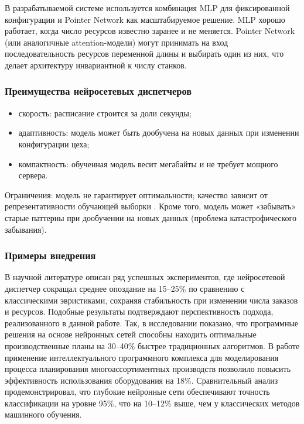 В разрабатываемой системе используется комбинация MLP для фиксированной конфигурации и Pointer Network как масштабируемое решение. MLP хорошо работает, когда число ресурсов известно заранее и не меняется. Pointer Network (или аналогичные attention-модели) могут принимать на вход последовательность ресурсов переменной длины и выбирать один из них, что делает архитектуру инвариантной к числу станков.

\subsubsection{Преимущества нейросетевых диспетчеров}

\begin{itemize}
    \item скорость: расписание строится за доли секунды;
    \item адаптивность: модель может быть дообучена на новых данных при изменении конфигурации цеха;
    \item компактность: обученная модель весит мегабайты и не требует мощного сервера.
\end{itemize}

Ограничения: модель не гарантирует оптимальности; качество зависит от репрезентативности обучающей выборки \cite{MLP}. Кроме того, модель может «забывать» старые паттерны при дообучении на новых данных (проблема катастрофического забывания).

\subsubsection{Примеры внедрения}

В научной литературе описан ряд успешных экспериментов, где нейросетевой диспетчер сокращал среднее опоздание на 15–25\% по сравнению с классическими эвристиками, сохраняя стабильность при изменении числа заказов и ресурсов. Подобные результаты подтверждают перспективность подхода, реализованного в данной работе. Так, в исследовании \cite{pugacheva} показано, что программные решения на основе нейронных сетей способны находить оптимальные производственные планы на 30–40\% быстрее традиционных алгоритмов. В работе \cite{Chistyakova} применение интеллектуального программного комплекса для моделирования процесса планирования многоассортиментных производств позволило повысить эффективность использования оборудования на 18\%. Сравнительный анализ \cite{sravnenieNS} продемонстрировал, что глубокие нейронные сети обеспечивают точность классификации на уровне 95\%, что на 10–12\% выше, чем у классических методов машинного обучения.

